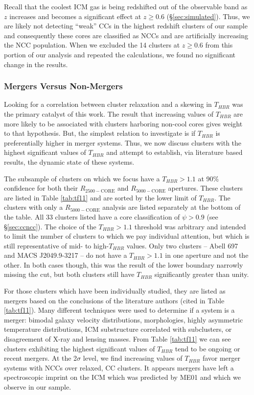 \documentclass[apj]{emulateapj}
\begin{document}
Recall that the coolest ICM gas is being redshifted out of the
observable band as $z$ increases and becomes a significant effect at
$z \geq 0.6$ (\S\ref{sec:simulated}). Thus, we are likely not detecting
``weak'' CCs in the highest redshift clusters of our sample and
consequently these cores are classified as NCCs and are artificially
increasing the NCC population. When we excluded the 14 clusters at $z
\geq 0.6$ from this portion of our analysis and repeated the
calculations, we found no significant change in the results.

\subsubsection{Mergers Versus Non-Mergers}\label{sec:merge}

Looking for a correlation between cluster relaxation and a skewing in
$T_{HBR}$ was the primary catalyst of this work. The result that
increasing values of $T_{HBR}$ are more likely to be associated with
clusters harboring non-cool cores gives weight to that hypothesis. But,
the simplest relation to investigate is if $T_{HBR}$ is preferentially
higher in merger systems. Thus, we now discuss clusters with the
highest significant values of $T_{HBR}$ and attempt to establish, via
literature based results, the dynamic state of these systems.

The subsample of clusters on which we focus have a $T_{HBR} > 1.1$ at
90\% confidence for both their $R_{2500-\mathrm{CORE}}$ and
$R_{5000-\mathrm{CORE}}$ apertures. These clusters are listed in Table
\ref{tab:tf11} and are sorted by the lower limit of $T_{HBR}$. The
clusters with only a $R_{5000-\mathrm{CORE}}$ analysis are listed
separately at the bottom of the table. All 33 clusters listed have a
core classification of $\psi > 0.9$ (see \S\ref{sec:ccncc}). The
choice of the $T_{HBR} > 1.1$ threshold was arbitrary and intended to
limit the number of clusters to which we pay individual attention, but
which is still representative of mid- to high-$T_{HBR}$ values. Only
two clusters -- Abell 697 and MACS J2049.9-3217 -- do not have a
$T_{HBR} > 1.1$ in one aperture and not the other. In both cases
though, this was the result of the lower boundary narrowly missing the
cut, but both clusters still have $T_{HBR}$ significantly greater than
unity.

For those clusters which have been individually studied, they are
listed as mergers based on the conclusions of the literature
authors (cited in Table \ref{tab:tf11}). Many different techniques
were used to determine if a system is a merger:  bimodal galaxy
velocity distributions, morphologies, highly asymmetric temperature
distributions, ICM substructure correlated with subclusters, or
disagreement of X-ray and lensing masses. From Table \ref{tab:tf11} we
can see clusters exhibiting the highest significant values of
$T_{HBR}$ tend to be ongoing or recent mergers. At the 2$\sigma$
level, we find increasing values of $T_{HBR}$ favor merger systems
with NCCs over relaxed, CC clusters. It appears mergers have left a
spectroscopic imprint on the ICM which was predicted by ME01 and which
we observe in our sample.
\end{document}
